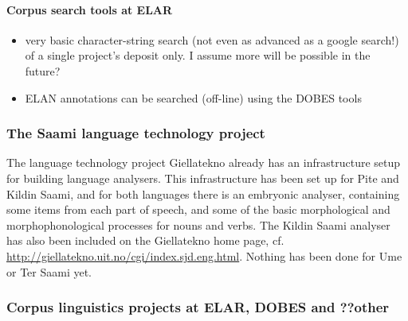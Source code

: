 \documentclass[a4paper,12pt]{article}
\begin{document}
\paragraph{Corpus search tools at ELAR} 
\begin{itemize}
\item very basic character-string search (not even as advanced as a google search!) of a single project's deposit only. I assume more will be possible in the future?
\item ELAN annotations can be searched (off-line) using the DOBES tools
\end{itemize}

\subsubsection{The Saami language technology project}

The language technology project Giellatekno already has an infrastructure setup for building language analysers. This infrastructure has been set up for Pite and Kildin Saami, and for both languages there is an embryonic analyser, containing some items from each part of speech, and some of the basic morphological and morphophonological processes for nouns and verbs. The Kildin Saami analyser has also been included on the Giellatekno home page, cf. \url{http://giellatekno.uit.no/cgi/index.sjd.eng.html}.  Nothing has been done for Ume or Ter Saami yet.


\subsubsection{Corpus linguistics projects at ELAR, DOBES and ??other}
\end{document}
